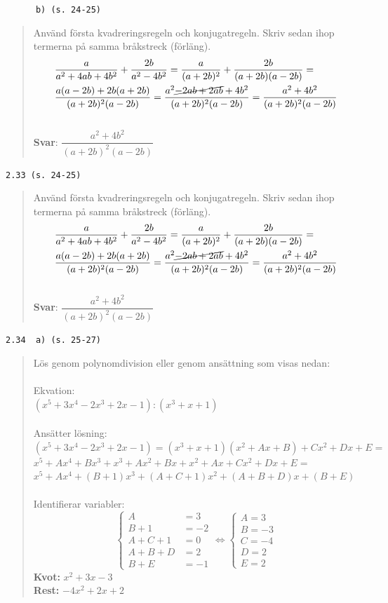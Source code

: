 \documentclass[a4paper]{article}
\newcommand{\tskcol}[1]{\textcolor{tskcol}{#1}}
\begin{document}
	\texttt{\tskcol{~~~~~~b) (s. 24-25)}}
	\begin{quotation}
		\noindent
		Använd första kvadreringsregeln och konjugatregeln. Skriv sedan ihop termerna på samma bråkstreck (förläng).
		\begin{align*}
			& \frac{a}{a^2+4ab+4b^2}+\frac{2b}{a^2-4b^2}=
			\frac{a}{(a+2b)^2}+\frac{2b}{(a+2b)(a-2b)}= \\
			& \frac{a(a-2b)+2b(a+2b)}{(a+2b)^2(a-2b)}=
			\frac{a^2\cancel{-2ab+2ab}+4b^2}{(a+2b)^2(a-2b)}=
			\frac{a^2+4b^2}{(a+2b)^2(a-2b)}
		\end{align*}
		\\
		\textbf{Svar}: $\dfrac{a^2+4b^2}{(a+2b)^2(a-2b)}$
	\end{quotation}
	
	\texttt{\tskcol{2.33 (s. 24-25)}}
	\begin{quotation}
		\noindent
		Använd första kvadreringsregeln och konjugatregeln. Skriv sedan ihop termerna på samma bråkstreck (förläng).
		\begin{align*}
		& \frac{a}{a^2+4ab+4b^2}+\frac{2b}{a^2-4b^2}=
		\frac{a}{(a+2b)^2}+\frac{2b}{(a+2b)(a-2b)}= \\
		& \frac{a(a-2b)+2b(a+2b)}{(a+2b)^2(a-2b)}=
		\frac{a^2\cancel{-2ab+2ab}+4b^2}{(a+2b)^2(a-2b)}=
		\frac{a^2+4b^2}{(a+2b)^2(a-2b)}
		\end{align*}
		\\
		\textbf{Svar}: $\dfrac{a^2+4b^2}{(a+2b)^2(a-2b)}$
	\end{quotation}
	
	\pagebreak
	\texttt{\tskcol{2.34~~a) (s. 25-27)}}
	\begin{quotation}
		\noindent
		Lös genom polynomdivision eller genom ansättning som visas nedan: \\ \\
		Ekvation: \\
		$(x^5+3x^4-2x^3+2x-1):(x^3+x+1)$ \\ \\
		Ansätter lösning: \\
		$(x^5+3x^4-2x^3+2x-1)=(x^3+x+1)(x^2+Ax+B)+Cx^2+Dx+E=$ \\
		$x^5+Ax^4+Bx^3+x^3+Ax^2+Bx+x^2+Ax+Cx^2+Dx+E=$ \\
		$x^5+Ax^4+(B+1)x^3+(A+C+1)x^2+(A+B+D)x+(B+E)$ \\ \\
		Identifierar variabler:\\
		\[\begin{cases} 
		A&=3 \\ 
		B+1&=-2 \\ 
		A+C+1&=0 \\
		A+B+D&=2 \\
		B+E&=-1
		\end{cases}
		\Leftrightarrow
		\begin{cases} 
		A=3 \\ 
		B=-3 \\
		C=-4 \\
		D=2 \\
		E=2
		\end{cases}\]
		\textbf{Kvot:} $x^2+3x-3$ \\
		\textbf{Rest:} $-4x^2+2x+2$
	\end{quotation}
	
\end{document}

